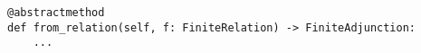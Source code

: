 \par\begin{minipage}{63ex}
\begin{verbatim}
@abstractmethod
def from_relation(self, f: FiniteRelation) -> FiniteAdjunction:
    ...
\end{verbatim}
\end{minipage}\par